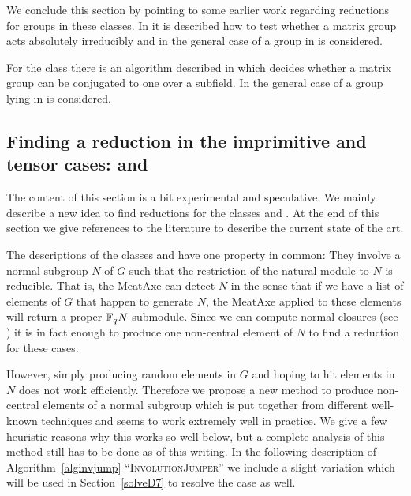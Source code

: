 We conclude this section by pointing to some earlier work regarding
reductions for groups in these classes. In \cite{MeatAxeHoltRees} it
is described how to test whether a matrix group acts absolutely
irreducibly and in \cite{smashnormal} the general case of a group
in  is considered.

For the class  there is an algorithm described in
\cite{GlasbyHowlett} which decides whether a matrix group can be
conjugated to one over a subfield. In \cite{GLGOB} the general case
of a group lying in  is considered.


\subsection{Finding a reduction in the imprimitive and tensor
cases:  and }
\label{solveD24}

The content of this section is a bit experimental and speculative. We
mainly describe a new idea to find reductions for the classes  and
. At the end of this section we give references to the literature
to describe the current state of the art.

The descriptions of the classes  and  have one property in common: They
involve a normal subgroup $N$ of $G$ such that the restriction of the
natural module to $N$ is reducible. That is, the MeatAxe can detect $N$ in
the sense that if we have a list of elements of $G$ that happen to generate $N$, 
the MeatAxe applied to these elements will return a proper $\mathbb{F}_q N$-submodule. 
Since we can compute normal closures (see \cite[Theorem~2.3.9]{Ser}) it is
in fact enough to produce one non-central element of $N$ to find a
reduction for these cases.

However, simply producing random elements in $G$ and hoping to hit elements
in $N$ does not work efficiently. Therefore we propose a new method to
produce non-central elements of a normal subgroup which is put together
from different well-known techniques and seems to work extremely well in
practice. We give a few heuristic reasons why this works so well below, but
a complete analysis of this method still has to be done as of this writing.
In the following description of Algorithm~\ref{alginvjump}
``\textsc{InvolutionJumper}'' we include a
slight variation which will be used in Section~\ref{solveD7} to resolve
the  case as well.

